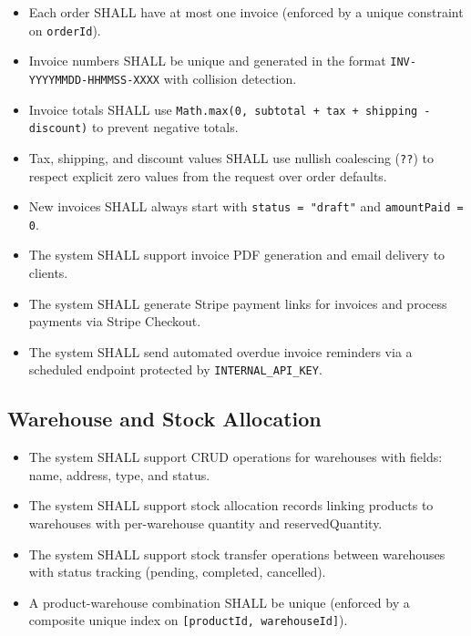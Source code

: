 \documentclass[12pt,a4paper]{report}
\begin{document}
\begin{tcolorbox}[reqbox,title={FR-INV: Invoice Requirements}]
\begin{itemize}[leftmargin=1.5em]
  \item {} Each order SHALL have at most one invoice (enforced by a unique constraint on \texttt{orderId}).
  \item {} Invoice numbers SHALL be unique and generated in the format \texttt{INV-YYYYMMDD-HHMMSS-XXXX} with collision detection.
  \item {} Invoice totals SHALL use \texttt{Math.max(0, subtotal + tax + shipping - discount)} to prevent negative totals.
  \item {} Tax, shipping, and discount values SHALL use nullish coalescing (\texttt{??}) to respect explicit zero values from the request over order defaults.
  \item {} New invoices SHALL always start with \texttt{status = "draft"} and \texttt{amountPaid = 0}.
  \item {} The system SHALL support invoice PDF generation and email delivery to clients.
  \item {} The system SHALL generate Stripe payment links for invoices and process payments via Stripe Checkout.
  \item {} The system SHALL send automated overdue invoice reminders via a scheduled endpoint protected by \texttt{INTERNAL\_API\_KEY}.
\end{itemize}
\end{tcolorbox}

\subsection{Warehouse and Stock Allocation}

\begin{tcolorbox}[reqbox,title={FR-WH: Warehouse Requirements}]
\begin{itemize}[leftmargin=1.5em]
  \item {} The system SHALL support CRUD operations for warehouses with fields: name, address, type, and status.
  \item {} The system SHALL support stock allocation records linking products to warehouses with per-warehouse quantity and reservedQuantity.
  \item {} The system SHALL support stock transfer operations between warehouses with status tracking (pending, completed, cancelled).
  \item {} A product-warehouse combination SHALL be unique (enforced by a composite unique index on \texttt{[productId, warehouseId]}).
\end{itemize}
\end{tcolorbox}
\end{document}
